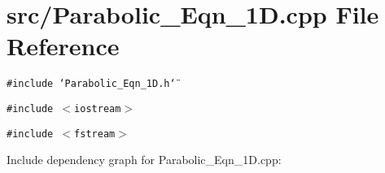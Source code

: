 \section{src/Parabolic\_\-Eqn\_\-1D.cpp File Reference}
\label{Parabolic__Eqn__1D_8cpp}
{\tt \#include \char`\"{}Parabolic\_\-Eqn\_\-1D.h\char`\"{}}\par
{\tt \#include $<$iostream$>$}\par
{\tt \#include $<$fstream$>$}\par


Include dependency graph for Parabolic\_\-Eqn\_\-1D.cpp: